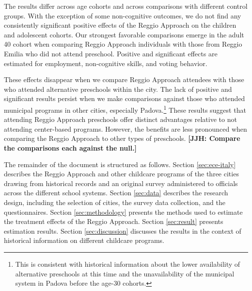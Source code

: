 The results differ across age cohorts and across comparisons with different control groups. With the exception of some non-cognitive outcomes, we do not find any consistently significant positive effects of the Reggio Approach on the children and adolescent cohorts. Our strongest favorable comparisons emerge in the adult 40 cohort when comparing Reggio Approach individuals with those from Reggio Emilia who did not attend preschool. Positive and significant effects are estimated for employment, non-cognitive skills, and voting behavior. 

These effects disappear when we compare Reggio Approach attendees with those who attended alternative preschools within the city. The lack of positive and significant results persist when we make comparisons against those who attended municipal programs in other cities, especially Padova.\footnote{This is consistent with historical information about the lower availability of alternative preschools at this time and the unavailability of the municipal system in Padova before the age-30 cohorts.} These results suggest that attending Reggio Approach preschools offer distinct advantages relative to not attending center-based programs. However, the benefits are less pronounced when comparing the Reggio Approach to other types of preschools. \textbf{[JJH: Compare the comparisons each against the null.]}

The remainder of the document is structured as follows. Section \ref{sec:ece-italy} describes the Reggio Approach and other childcare programs of the three cities drawing from historical records and an original survey administered to officials across the different school systems. Section \ref{sec:data} describes the research design, including the selection of cities, the survey data collection, and the questionnaires. Section \ref{sec:methodology} presents the methods used to estimate the treatment effects of the Reggio Approach. Section \ref{sec:result} presents estimation results. Section \ref{sec:discussion} discusses the results in the context of historical information on different childcare programs.

